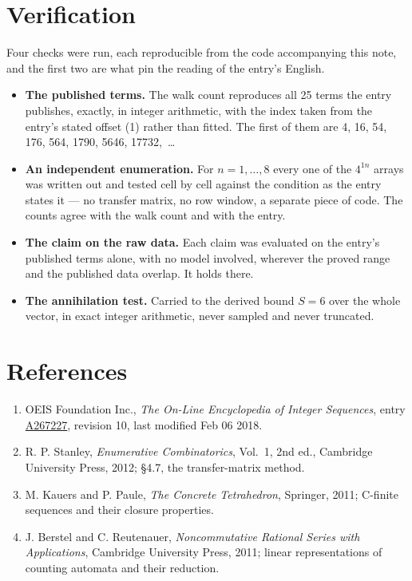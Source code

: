 \documentclass[11pt]{article}
\theoremstyle{definition}
\begin{document}
\section{Verification}

Four checks were run, each reproducible from the code accompanying this note, and the first two are what pin the reading of the entry's English.

\begin{itemize}

\item {\bfseries The published terms.} The walk count reproduces all 25 terms the entry publishes, exactly, in integer arithmetic, with the index taken from the entry's stated offset (1) rather than fitted. The first of them are 4, 16, 54, 176, 564, 1790, 5646, 17732,~\dots

\item {\bfseries An independent enumeration.} For $n = 1,\dots,8$ every one of the $4^{1n}$ arrays was written out and tested cell by cell against the condition as the entry states it --- no transfer matrix, no row window, a separate piece of code. The counts agree with the walk count and with the entry.

\item {\bfseries The claim on the raw data.} Each claim was evaluated on the entry's published terms alone, with no model involved, wherever the proved range and the published data overlap. It holds there.

\item {\bfseries The annihilation test.} Carried to the derived bound $S = 6$ over the whole vector, in exact integer arithmetic, never sampled and never truncated.

\end{itemize}

\section{References}

\begin{enumerate}

\item OEIS Foundation Inc., \emph{The On-Line Encyclopedia of Integer Sequences}, entry \href{https://oeis.org/A267227}{A267227}, revision 10, last modified Feb 06 2018.

\item R. P. Stanley, \emph{Enumerative Combinatorics}, Vol.~1, 2nd ed., Cambridge University Press, 2012; \S4.7, the transfer-matrix method.

\item M. Kauers and P. Paule, \emph{The Concrete Tetrahedron}, Springer, 2011; C-finite sequences and their closure properties.

\item J. Berstel and C. Reutenauer, \emph{Noncommutative Rational Series with Applications}, Cambridge University Press, 2011; linear representations of counting automata and their reduction.

\end{enumerate}
\end{document}
